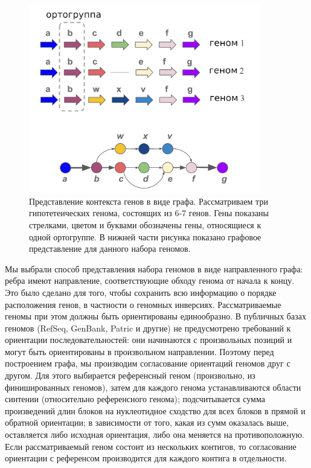 \begin{figure}[!ht] 
  \center
    \includegraphics [width=0.9\textwidth] {Dissertation/images/graph/graph_scheme.png}
    \caption{Представление контекста генов в виде графа. Рассматриваем три гипотетеических генома, состоящих из 6-7 генов. Гены показаны стрелками, цветом и буквами обозначены гены, относящиеся к одной ортогруппе. В нижней части рисунка показано графовое представление для данного набора геномов.}
    \label{img:graph_scheme}
\end{figure}

Мы выбрали способ представления  набора геномов в виде направленного графа:  ребра имеют направление, соответствующие обходу генома от начала к концу. Это было сделано для того, чтобы сохранить всю информацию о порядке расположения генов, в частности о геномных инверсиях. Рассматриваемые геномы при этом должны быть ориентированы единообразно. В публичных базах геномов (RefSeq, GenBank, Patric и другие) не предусмотрено требований к ориентации последовательностей: они начинаются с произвольных позиций и могут быть ориентированы в произвольном направлении. Поэтому перед построением графа, мы производим согласование ориентаций геномов друг с другом. Для этого выбирается референсный геном (произвольно, из финишированных геномов), затем для каждого генома устанавливаются области синтении (относительно референсного генома); подсчитывается сумма произведений длин блоков на нуклеотидное сходство для всех блоков в прямой и обратной ориентации; в зависимости от того, какая из сумм оказалась выше, оставляется либо исходная ориентация, либо она меняется на противоположную. Если рассматриваемый геном состоит из нескольких контигов, то согласование ориентации с референсом производится для каждого контига в отдельности.

